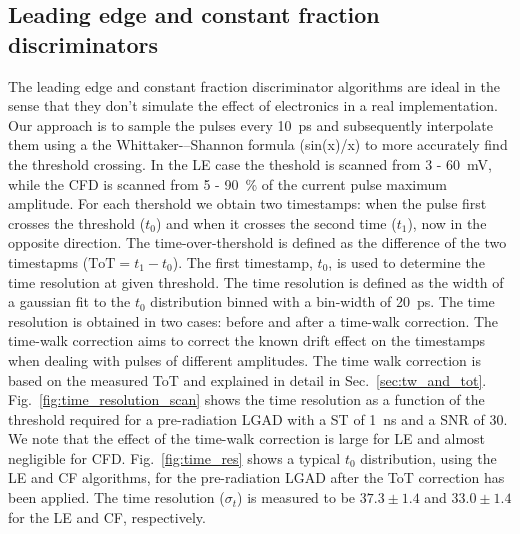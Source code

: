 \documentclass[preprint,1p]{elsarticle}
\begin{document}
\subsection{Leading edge and constant fraction discriminators}\label{sec:le_and_cfd}
The leading edge and constant fraction discriminator algorithms are ideal in the sense that they don't simulate the effect of
electronics in a real implementation. Our approach is to sample the pulses every 10~\si{ps} and subsequently interpolate them
 using a the Whittaker-–Shannon formula (sin(x)/x) to more accurately find the threshold crossing. In the LE case the theshold is scanned
 from 3 - 60~\si{mV}, while the CFD is scanned from 5 - 90~\% of the current pulse maximum amplitude. For each thershold we obtain two
 timestamps: when the pulse first crosses the threshold ($t_{0}$) and when it crosses the second time ($t_{1}$), now in the opposite
 direction. The time-over-thershold is defined as the difference of the two timestapms ($\mathrm{ToT} = t_{1} - t_{0}$). The first
 timestamp, $t_{0}$, is used to determine the time resolution at given threshold. The time resolution is defined as the width of
 a gaussian fit to the $t_{0}$ distribution binned with a bin-width of 20~\si{ps}. The time resolution is obtained in two cases:
 before and after a time-walk correction. The time-walk correction aims to correct the known drift effect on the timestamps when
 dealing with pulses of different amplitudes. The time walk correction is based on the measured ToT and explained in detail
 in Sec.~\ref{sec:tw_and_tot}. Fig.~\ref{fig:time_resolution_scan} shows the time resolution as a function
 of the threshold required for a pre-radiation LGAD with a ST of 1~\si{ns} and a SNR of 30.
 We note that the effect of the time-walk correction is large for LE and almost negligible for CFD.
 Fig.~\ref{fig:time_res} shows a typical $t_{0}$ distribution, using the LE and CF algorithms, for the pre-radiation
  LGAD after the ToT correction has been applied. The time resolution ($\sigma_{t}$) is measured to be $37.3 \pm 1.4 $
  and $33.0 \pm 1.4$ for the LE and CF, respectively.
\end{document}
